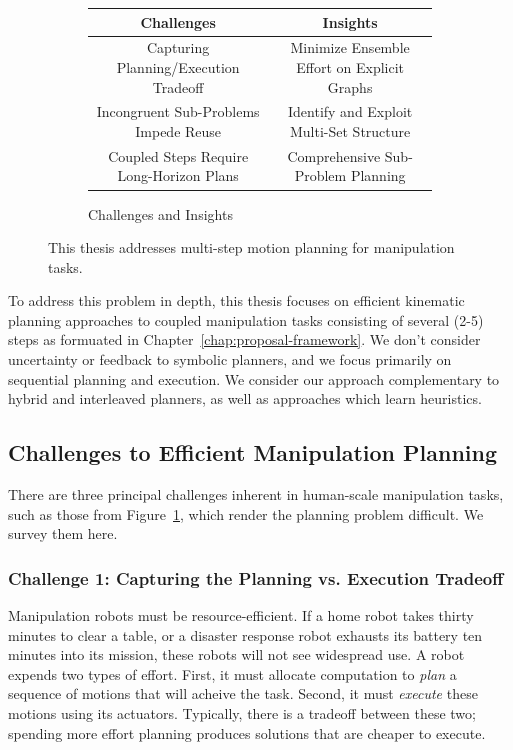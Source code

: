 \begin{figure}
{\begin{widepage}
   \vspace{0.1in}
   \begin{subfigure}[t]{\textwidth}
      \centering
      \begin{tabular}{cc}
         \toprule
         Challenges & Insights \\
         \midrule
         Capturing Planning/Execution Tradeoff
            & Minimize Ensemble Effort on Explicit Graphs \\
         Incongruent Sub-Problems Impede Reuse
            & Identify and Exploit Multi-Set Structure \\
         Coupled Steps Require Long-Horizon Plans
            & Comprehensive Sub-Problem Planning \\
         \bottomrule
      \end{tabular}
      \caption{Challenges and Insights}
   \end{subfigure}
   \caption{This thesis addresses multi-step motion planning
      for manipulation tasks.}
   \label{fig:intro-examples}
\end{widepage}
}%
\end{figure}

To address this problem in depth,
this thesis focuses on
efficient kinematic planning approaches
to coupled manipulation tasks consisting of several (2-5) steps
as formuated in Chapter~\ref{chap:proposal-framework}.
We don't consider uncertainty
or feedback to symbolic planners,
and we focus primarily on sequential planning and execution.
We consider our approach complementary to
hybrid and interleaved planners,
as well as approaches which learn heuristics.

\subsection*{Challenges to Efficient Manipulation Planning}

There are three principal challenges inherent in
human-scale manipulation tasks,
such as those from Figure~\ref{fig:intro-examples},
which render the planning problem difficult.
We survey them here.

\subsubsection*{Challenge 1:
   Capturing the Planning vs. Execution Tradeoff}

Manipulation robots must be resource-efficient.
If a home robot takes thirty minutes to clear a table,
or a disaster response robot exhausts its battery ten minutes
into its mission,
these robots will not see widespread use.
A robot expends two types of effort.
First, it must allocate computation to \emph{plan}
a sequence of motions that will acheive the task.
Second, it must \emph{execute} these motions using its actuators.
Typically, there is a tradeoff between these two;
spending more effort planning produces solutions that are
cheaper to execute.

